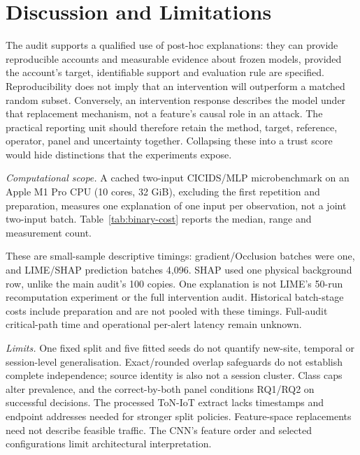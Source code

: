 \section{Discussion and Limitations}

The audit supports a qualified use of post-hoc explanations: they can provide
reproducible accounts and measurable evidence about frozen models, provided the
account's target, identifiable support and evaluation rule are specified.
Reproducibility does not imply that an intervention will outperform a matched
random subset. Conversely, an intervention response describes the model under
that replacement mechanism, not a feature's causal role in an attack.
The practical reporting unit should therefore retain the method, target,
reference, operator, panel and uncertainty together. Collapsing these into a
trust score would hide distinctions that the experiments expose.

\emph{Computational scope.} A cached two-input CICIDS/MLP microbenchmark on an
Apple M1 Pro CPU (10 cores, 32 GiB), excluding the first repetition and
preparation, measures one explanation of one input per observation, not a
joint two-input batch. Table~\ref{tab:binary-cost} reports the median, range
and measurement count.
\begin{table}[t]
\centering\small
\caption{Single-input CPU timings (ms); first repetition excluded.
Two fixed inputs supply the $n$ individual measurements per method.}
\label{tab:binary-cost}

\end{table}
These are small-sample descriptive timings: gradient/Occlusion batches were
one, and LIME/SHAP prediction batches 4,096. SHAP used one physical background
row, unlike the main audit's 100 copies. One explanation is not LIME's
50-run recomputation experiment or the full intervention audit. Historical
batch-stage costs include preparation and are not pooled with these timings.
Full-audit critical-path time and operational per-alert latency remain unknown.

\emph{Limits.} One fixed split and five fitted seeds do not quantify new-site,
temporal or session-level generalisation. Exact/rounded overlap safeguards
do not establish complete independence; source identity is also not a
session cluster. Class caps alter prevalence, and the correct-by-both panel
conditions RQ1/RQ2 on successful decisions. The processed ToN-IoT extract lacks
timestamps and endpoint addresses needed for stronger split policies.
Feature-space replacements need not describe feasible traffic. The CNN's
feature order and selected configurations limit architectural interpretation.

